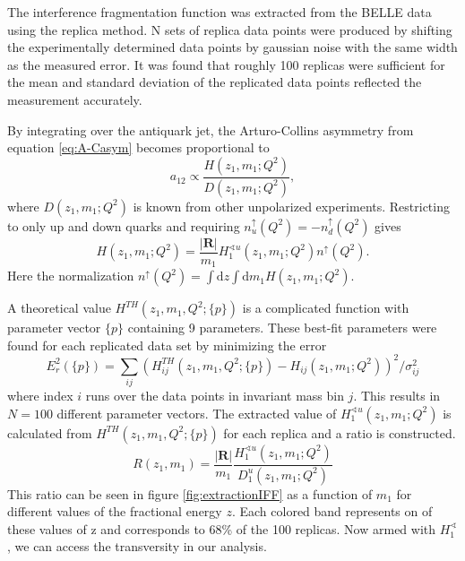\documentclass[abstract = on,listof=totoc, bibliography=totoc]{scrreprt}
\begin{document}
The interference fragmentation function was extracted from the BELLE data using the replica method\cite{extractIFF}. N sets of replica data points were produced by shifting the experimentally determined data points by gaussian noise with the same width as the measured error. It was found that roughly 100 replicas were sufficient for the mean and standard deviation of the replicated data points reflected the measurement accurately\cite{extractIFF2}. 

By integrating over the antiquark jet, the Arturo-Collins asymmetry from equation \ref{eq:A-Casym} becomes proportional to
\begin{equation}
a_{12} \propto \frac{H(z_1,m_1;Q^2)}{D(z_1,m_1;Q^2)},
\end{equation}
where $D(z_1,m_1;Q^2)$ is known from other unpolarized experiments. Restricting to only up and down quarks and requiring $n_u^\uparrow(Q^2) = -n_d^\uparrow(Q^2)$ gives
\begin{equation}
H(z_1,m_1;Q^2) = \frac{|\bm{R}|}{m_1}H_1^{\sphericalangle u}(z_1,m_1;Q^2)n^\uparrow(Q^2).
\end{equation}
Here the normalization $n^\uparrow(Q^2) = \int\text{d}z\int\text{d}m_1 H(z_1,m_1;Q^2)$. 

A theoretical value $H^{TH}(z_1,m_1,Q^2;\{p\})$ is a complicated function\cite{RealEstValTrans} with parameter vector $\{p\}$ containing 9 parameters. These best-fit parameters were found for each replicated data set by minimizing the error
\begin{equation}
E_r^2(\{p\}) = \sum\limits_{ij} \left(H_{ij}^{TH}(z_1,m_1,Q^2;\{p\}) - H_{ij}(z_1,m_1;Q^2)\right)^2/\sigma_{ij}^2
\end{equation}
where index $i$ runs over the data points in invariant mass bin $j$. This results in $N=100$ different parameter vectors. The extracted value of $H_1^{\sphericalangle u}(z_1,m_1;Q^2)$ is calculated from $H^{TH}(z_1,m_1,Q^2;\{p\})$ for each replica and a ratio is constructed.
\begin{equation}
R(z_1,m_1) = \frac{|\bm{R}|}{m_1} \frac{H_1^{\sphericalangle u}(z_1,m_1;Q^2)}{D_1^u(z_1,m_1;Q^2)}
\end{equation}
This ratio can be seen in figure \ref{fig:extractionIFF} as a function of $m_1$ for different values of the fractional energy $z$. Each colored band represents on of these values of z and corresponds to 68\% of the 100 replicas. Now armed with $H_1^\sphericalangle$, we can access the transversity in our analysis.  
\end{document}

